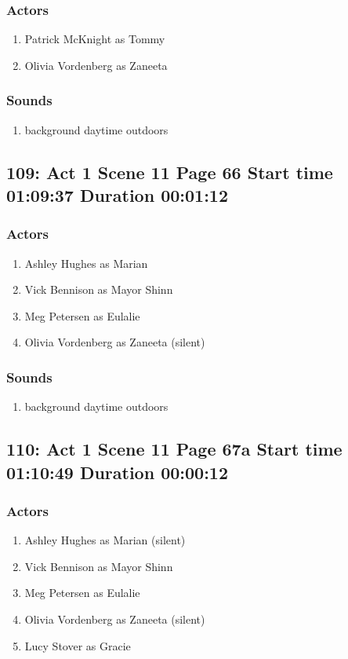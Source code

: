 \subsubsection{Actors}
\begin{enumerate}
\item Patrick McKnight as Tommy
\item Olivia Vordenberg as Zaneeta
\end{enumerate}

\subsubsection{Sounds}
\begin{enumerate}
\item background daytime outdoors
\end{enumerate}
\subsection{109: Act 1 Scene 11 Page 66 Start time 01:09:37 Duration 00:01:12}

\subsubsection{Actors}
\begin{enumerate}
\item Ashley Hughes as Marian
\item Vick Bennison as Mayor Shinn
\item Meg Petersen as Eulalie
\item Olivia Vordenberg as Zaneeta (silent)
\end{enumerate}

\subsubsection{Sounds}
\begin{enumerate}
\item background daytime outdoors
\end{enumerate}
\subsection{110: Act 1 Scene 11 Page 67a Start time 01:10:49 Duration 00:00:12}

\subsubsection{Actors}
\begin{enumerate}
\item Ashley Hughes as Marian (silent)
\item Vick Bennison as Mayor Shinn
\item Meg Petersen as Eulalie
\item Olivia Vordenberg as Zaneeta (silent)
\item Lucy Stover as Gracie
\end{enumerate}

